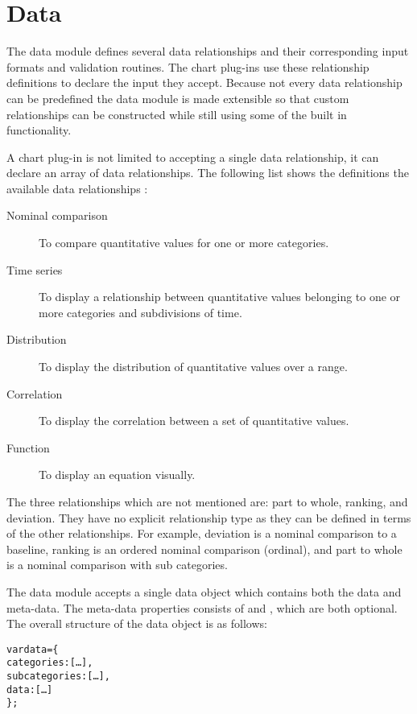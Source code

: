 \section{Data}
The data module defines several data relationships and their corresponding input formats and validation routines. The chart plug-ins use these relationship definitions to declare the input they accept. Because not every data relationship can be predefined the data module is made extensible so that custom relationships can be constructed while still using some of the built in functionality.

A chart plug-in is not limited to accepting a single data relationship, it can declare an array of data relationships. The following list shows the definitions the available data relationships \cite{few06}:

\begin{description}
\item[Nominal comparison] To compare quantitative values for one or more categories.
\item[Time series] To display a relationship between quantitative values belonging to one or more categories and subdivisions of time.
\item[Distribution] To display the distribution of quantitative values over a range.
\item[Correlation] To display the correlation between a set of quantitative values.
\item[Function] To display an equation visually.
\end{description}

The three relationships which are not mentioned are: part to whole, ranking, and deviation. They have no explicit relationship type as they can be defined in terms of the other relationships. For example, deviation is a nominal comparison to a baseline, ranking is an ordered nominal comparison (ordinal), and part to whole is a nominal comparison with sub categories.

The data module accepts a single data object which contains both the data and meta-data. The meta-data properties consists of  and , which are both optional. The overall structure of the data object is as follows:
\begin{alltt}
  var data = \{
    categories: [\ldots],
    subcategories: [\ldots],
    data: [\ldots]
  \};
\end{alltt}

